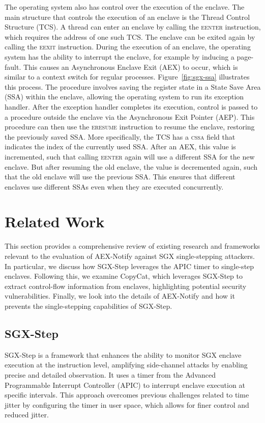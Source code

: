 \documentclass{llncs}
\begin{document}
The operating system also has control over the execution of the enclave.
The main structure that controls the execution of an enclave is the Thread
Control Structure (TCS).
A thread can enter an enclave by calling the \textsc{eenter} instruction,
which requires the address of one such TCS.
The enclave can be exited again by calling the \textsc{eexit} instruction.
During the execution of an enclave, the operating system has the ability to
interrupt the enclave, for example by inducing a page-fault.
This causes an Asynchronous Enclave Exit (AEX) to occur, which is similar to a
context switch for regular processes.
Figure~\ref{fig:sgx-ssa} illustrates this process.
The procedure involves saving the register state in a State Save Area (SSA)
within the enclave, allowing the operating system to run its exception handler.
After the exception handler completes its execution, control is passed to a
procedure outside the enclave via the Asynchronous Exit Pointer (AEP).
This procedure can then use the \textsc{eresume} instruction to resume the
enclave, restoring the previously saved SSA.
More specifically, the TCS has a \textsc{cssa} field that indicates the index
of the currently used SSA.
After an AEX, this value is incremented, such that calling \textsc{eenter}
again will use a different SSA for the new enclave.
But after resuming the old enclave, the value is decremented again, such that
the old enclave will use the previous SSA.
This ensures that different enclaves use different SSAs even when they are
executed concurrently.

\section{Related Work}

This section provides a comprehensive review of existing research and
frameworks relevant to the evaluation of AEX-Notify against SGX single-stepping
attackers.
In particular, we discuss how SGX-Step leverages the APIC timer to single-step
enclaves.
Following this, we examine CopyCat, which leverages SGX-Step to extract
control-flow information from enclaves, highlighting potential security
vulnerabilities.
Finally, we look into the details of AEX-Notify and how it prevents the
single-stepping capabilities of SGX-Step.

\subsection{SGX-Step}

SGX-Step \cite{BulckPS17} is a framework that enhances the ability to monitor
SGX enclave execution at the instruction level, amplifying side-channel attacks
by enabling precise and detailed observation.
It uses a timer from the Advanced Programmable Interrupt Controller (APIC) to
interrupt enclave execution at specific intervals.
This approach overcomes previous challenges related to time jitter by
configuring the timer in user space, which allows for finer control and reduced
jitter.
\end{document}
